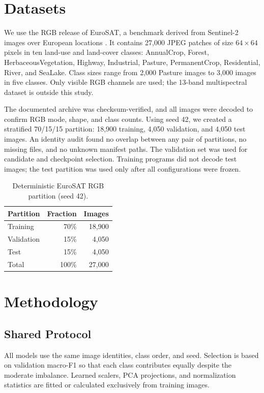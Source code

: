 \documentclass[conference]{IEEEtran}
\begin{document}
\section{Datasets}

We use the RGB release of EuroSAT, a benchmark derived from Sentinel-2 images
over European locations \cite{helber2019}. It contains 27,000 JPEG patches of
size $64\times64$ pixels in ten land-use and land-cover classes: AnnualCrop,
Forest, HerbaceousVegetation, Highway, Industrial, Pasture, PermanentCrop,
Residential, River, and SeaLake. Class sizes range from 2,000 Pasture images to
3,000 images in five classes. Only visible RGB channels are used; the 13-band
multispectral dataset is outside this study.

The documented archive was checksum-verified, and all images were decoded to
confirm RGB mode, shape, and class counts. Using seed 42, we created a
stratified 70/15/15 partition: 18,900 training, 4,050 validation, and 4,050
test images. An identity audit found no overlap between any pair of partitions,
no missing files, and no unknown manifest paths. The validation set was used
for candidate and checkpoint selection. Training programs did not decode test
images; the test partition was used only after all configurations were frozen.

\begin{table}[t]
\centering
\caption{Deterministic EuroSAT RGB partition (seed 42).}
\label{tab:split}
\footnotesize
\begin{tabular}{lrr}
\toprule
Partition & Fraction & Images \\
\midrule
Training   & 70\% & 18,900 \\
Validation & 15\% & 4,050 \\
Test       & 15\% & 4,050 \\
\midrule
Total      & 100\% & 27,000 \\
\bottomrule
\end{tabular}
\end{table}

\section{Methodology}

\subsection{Shared Protocol}

All models use the same image identities, class order, and seed. Selection is
based on validation macro-F1 so that each class contributes equally despite
the moderate imbalance. Learned scalers, PCA projections, and normalization
statistics are fitted or calculated exclusively from training images.
\end{document}

